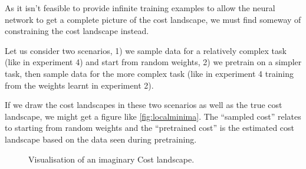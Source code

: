 As it isn't feasible to provide infinite training examples to allow the neural network to get a complete picture of the cost landscape, we must find someway of constraining the cost landscape instead.

Let us consider two scenarios, 1) we sample data for a relatively complex task (like in experiment 4) and start from random weights, 2) we pretrain on a simpler task, then sample data for the more complex task (like in experiment 4 training from the weights learnt in experiment 2).

If we draw the cost landscapes in these two scenarios as well as the true cost landscape, we might get a figure like \autoref{fig:localminima}. The ``sampled cost'' relates to starting from random weights and the ``pretrained cost'' is the estimated cost landscape based on the data seen during pretraining.
\begin{figure}[h!]
\begin{center}
\caption{Visualisation of an imaginary Cost landscape.}
\label{fig:localminima}
\end{center}
\end{figure}

